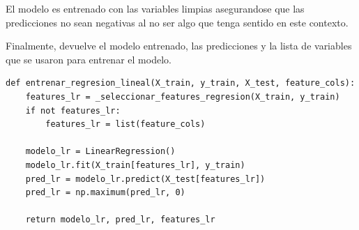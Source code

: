 El modelo es entrenado con las variables limpias asegurandose que las predicciones no sean negativas al no ser algo que tenga sentido en este contexto. 

Finalmente, devuelve el modelo entrenado, las predicciones y la lista de variables que se usaron para entrenar el modelo.

\label{lst:entrenar_regresion_lineal}
\begin{verbatim}
def entrenar_regresion_lineal(X_train, y_train, X_test, feature_cols):
    features_lr = _seleccionar_features_regresion(X_train, y_train)
    if not features_lr:
        features_lr = list(feature_cols)

    modelo_lr = LinearRegression()
    modelo_lr.fit(X_train[features_lr], y_train)
    pred_lr = modelo_lr.predict(X_test[features_lr])
    pred_lr = np.maximum(pred_lr, 0)

    return modelo_lr, pred_lr, features_lr

\end{verbatim}

